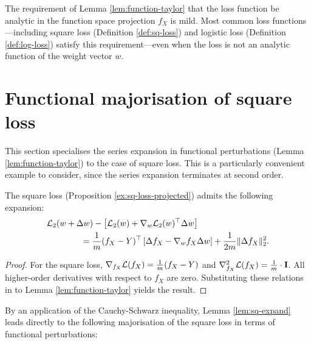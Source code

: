\begin{refsection}
The requirement of Lemma \ref{lem:function-taylor} that the loss function be analytic in the function space projection $f_X$ is mild. Most common loss functions---including square loss (Definition \ref{def:sq-loss}) and logistic loss (Definition \ref{def:log-loss}) satisfy this requirement---even when the loss is not an analytic function of the weight vector $w$.

\section{Functional majorisation of square loss}

This section specialises the series expansion in functional perturbations (Lemma \ref{lem:function-taylor}) to the case of square loss. This is a particularly convenient example to consider, since the series expansion terminates at second order.

\begin{lemma}\label{lem:sq-expand} The square loss (Proposition \ref{ex:sq-loss-projected}) admits the following expansion:
    \begin{align}
        &\mathcal{L}_2(w+\Delta w) -\left[ \mathcal{L}_2(w) + \nabla_w\mathcal{L}_2(w)^\top \Delta w\right] \nonumber \\
        &\qquad\qquad= \frac{1}{m} (f_X-Y)^\top \left[\Delta f_X - \nabla_w f_X \Delta w \right] + \frac{1}{2m} \|\Delta f_X\|_2^2.
    \end{align}
\end{lemma}
\begin{proof}
For the square loss, $\nabla_{f_X} \mathcal{L}(f_X) = \frac{1}{m}(f_X-Y)$ and $\nabla^2_{f_X} \mathcal{L}(f_X) = \frac{1}{m} \cdot \mathbf{I}$. All higher-order derivatives with respect to $f_X$ are zero. Substituting these relations in to Lemma \ref{lem:function-taylor} yields the result.
\end{proof}

By an application of the Cauchy-Schwarz inequality, Lemma \ref{lem:sq-expand} leads directly to the following majorisation of the square loss in terms of functional perturbations:


\end{refsection}
